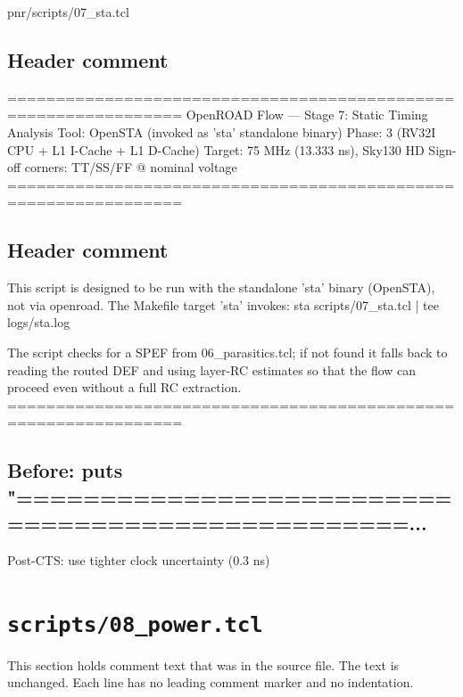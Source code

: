 \begin{relocated}{pnr/scripts/07_sta.tcl}

\subsection*{Header comment}

\begin{textblock}
================================================================
OpenROAD Flow — Stage 7: Static Timing Analysis
Tool: OpenSTA (invoked as 'sta' standalone binary)
Phase: 3 (RV32I CPU + L1 I-Cache + L1 D-Cache)
Target: 75 MHz (13.333 ns), Sky130 HD
Sign-off corners: TT/SS/FF @ nominal voltage
================================================================
\end{textblock}

\subsection*{Header comment}

\begin{textblock}
This script is designed to be run with the standalone 'sta' binary
(OpenSTA), not via openroad.  The Makefile target 'sta' invokes:
  sta scripts/07_sta.tcl | tee logs/sta.log

The script checks for a SPEF from 06_parasitics.tcl; if not found it
falls back to reading the routed DEF and using layer-RC estimates so
that the flow can proceed even without a full RC extraction.
================================================================
\end{textblock}

\subsection*{Before: puts "==================================================...}

\begin{textblock}
Post-CTS: use tighter clock uncertainty (0.3 ns)
\end{textblock}

\end{relocated}

\section{\texttt{scripts/08\_power.tcl}}\label{tm:pd:scripts-08-power-tcl}

This section holds comment text that was in the source file. The text is unchanged. Each line has no leading comment marker and no indentation.

